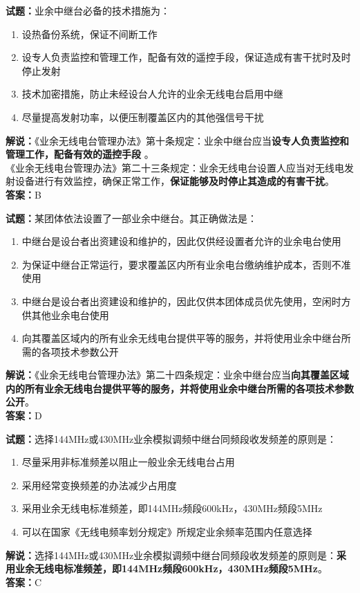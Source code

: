 \documentclass{ctexbook}
\begin{document}
\vspace{\baselineskip}

\noindent\textbf{试题：}业余中继台必备的技术措施为：
\begin{enumerate}[leftmargin=3em]
  \item 设热备份系统，保证不间断工作
  \item 设专人负责监控和管理工作，配备有效的遥控手段，保证造成有害干扰时及时停止发射
  \item 技术加密措施，防止未经设台人允许的业余无线电台启用中继
  \item 尽量提高发射功率，以便压制覆盖区内的其他强信号干扰
\end{enumerate}
\noindent\textbf{解说：}《业余无线电台管理办法》第十条规定：业余中继台应当\textbf{设专人负责监控和管理工作，配备有效的遥控手段 }。\\
《业余无线电台管理办法》第二十三条规定：业余无线电台设置人应当对无线电发射设备进行有效监控，确保正常工作，\textbf{保证能够及时停止其造成的有害干扰}。 \\\noindent\textbf{答案：}B

\vspace{\baselineskip}

\noindent\textbf{试题：}某团体依法设置了一部业余中继台。其正确做法是：
\begin{enumerate}[leftmargin=3em]
  \item 中继台是设台者出资建设和维护的，因此仅供经设置者允许的业余电台使用
  \item 为保证中继台正常运行，要求覆盖区内所有业余电台缴纳维护成本，否则不准使用
  \item 中继台是设台者出资建设和维护的，因此仅供本团体成员优先使用，空闲时方供其他业余电台使用
  \item 向其覆盖区域内的所有业余无线电台提供平等的服务，并将使用业余中继台所需的各项技术参数公开
\end{enumerate}
\noindent\textbf{解说：}《业余无线电台管理办法》第二十四条规定：业余中继台应当\textbf{向其覆盖区域内的所有业余无线电台提供平等的服务，并将使用业余中继台所需的各项技术参数公开}。\\\noindent\textbf{答案：}D

\vspace{\baselineskip}

\noindent\textbf{试题：}选择144\unit{\MHz}或430\unit{\MHz}业余模拟调频中继台同频段收发频差的原则是：
\begin{enumerate}[leftmargin=3em]
  \item 尽量采用非标准频差以阻止一般业余无线电台占用
  \item 采用经常变换频差的办法减少占用度
  \item 采用业余无线电标准频差，即144\unit{\MHz}频段600\unit{\kHz}，430\unit{\MHz}频段5\unit{\MHz}
  \item 可以在国家《无线电频率划分规定》所规定业余频率范围内任意选择
\end{enumerate}
\noindent\textbf{解说：}选择144\unit{\MHz}或430\unit{\MHz}业余模拟调频中继台同频段收发频差的原则是：\textbf{采用业余无线电标准频差，即144\unit{\MHz}频段600\unit{\kHz}，430\unit{\MHz}频段5\unit{\MHz}}。\\\noindent\textbf{答案：}C
\end{document}
